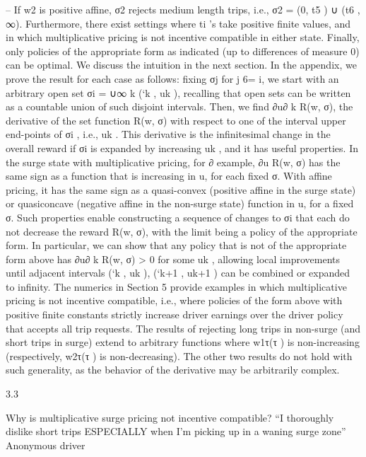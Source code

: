 \documentclass[10pt]{article}
\begin{document}
\begin{ReviewVerbatim}
– If w2 is positive affine, σ2 rejects medium length trips, i.e., σ2 = (0, t5 ) ∪ (t6 , ∞).
Furthermore, there exist settings where ti ’s take positive finite values, and in which multiplicative
pricing is not incentive compatible in either state. Finally, only policies of the appropriate form as
indicated (up to differences of measure 0) can be optimal.
We discuss the intuition in the next section. In the appendix, we prove the result for each case
as follows: fixing σj for j 6= i, we start with an arbitrary open set σi = ∪∞
k (`k , uk ), recalling that
open sets can be written as a countable union of such disjoint intervals. Then, we find ∂u∂ k R(w, σ),
the derivative of the set function R(w, σ) with respect to one of the interval upper end-points
of σi , i.e., uk . This derivative is the infinitesimal change in the overall reward if σi is expanded
by increasing uk , and it has useful properties. In the surge state with multiplicative pricing, for
∂
example, ∂u
R(w, σ) has the same sign as a function that is increasing in u, for each fixed σ. With
affine pricing, it has the same sign as a quasi-convex (positive affine in the surge state) or quasiconcave (negative affine in the non-surge state) function in u, for a fixed σ. Such properties enable
constructing a sequence of changes to σi that each do not decrease the reward R(w, σ), with the
limit being a policy of the appropriate form. In particular, we can show that any policy that is not
of the appropriate form above has ∂u∂ k R(w, σ) > 0 for some uk , allowing local improvements until
adjacent intervals (`k , uk ), (`k+1 , uk+1 ) can be combined or expanded to infinity. The numerics in
Section 5 provide examples in which multiplicative pricing is not incentive compatible, i.e., where
policies of the form above with positive finite constants strictly increase driver earnings over the
driver policy that accepts all trip requests.
The results of rejecting long trips in non-surge (and short trips in surge) extend to arbitrary
functions where w1τ(τ ) is non-increasing (respectively, w2τ(τ ) is non-decreasing). The other two results
do not hold with such generality, as the behavior of the derivative may be arbitrarily complex.

3.3

Why is multiplicative surge pricing not incentive compatible?
“I thoroughly dislike short trips ESPECIALLY when I’m picking up in a waning surge zone”
Anonymous driver


\end{ReviewVerbatim}
\end{document}
